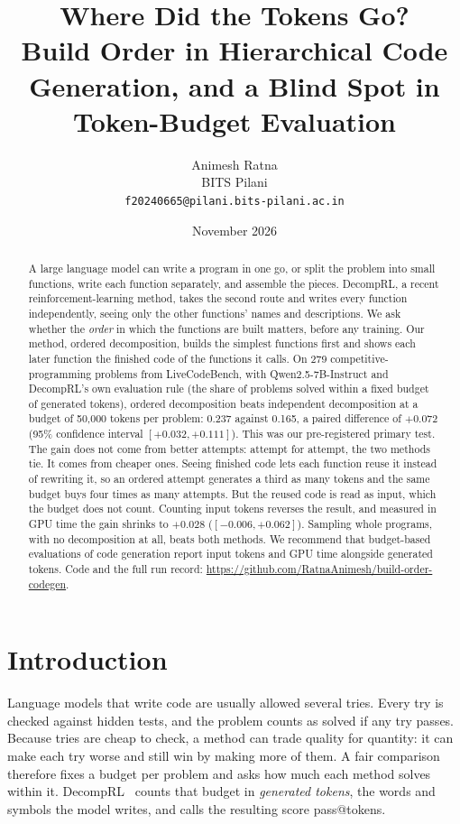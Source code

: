 \documentclass[11pt]{article}
\title{\textbf{Where Did the Tokens Go?}\\[4pt]
\large Build Order in Hierarchical Code Generation, and a Blind Spot in Token-Budget Evaluation}
\author{Animesh Ratna\\[2pt]
{\normalsize BITS Pilani}\\[1pt]
{\normalsize\texttt{f20240665@pilani.bits-pilani.ac.in}}}
\date{November 2026}
\begin{document}
\maketitle

\begin{abstract}
A large language model can write a program in one go, or split the problem into small functions, write each function
separately, and assemble the pieces. DecompRL, a recent reinforcement-learning method, takes the second route and
writes every function independently, seeing only the other functions' names and descriptions. We ask whether the
\emph{order} in which the functions are built matters, before any training. Our method, ordered decomposition, builds
the simplest functions first and shows each later function the finished code of the functions it calls.
On 279 competitive-programming problems from LiveCodeBench, with Qwen2.5-7B-Instruct and DecompRL's own evaluation
rule (the share of problems solved within a fixed budget of generated tokens), ordered decomposition beats independent
decomposition at a budget of 50,000 tokens per problem: 0.237 against 0.165, a paired difference of $+0.072$ (95\%
confidence interval $[+0.032, +0.111]$). This was our pre-registered primary test.
The gain does not come from better attempts: attempt for attempt, the two methods tie. It comes from cheaper ones.
Seeing finished code lets each function reuse it instead of rewriting it, so an ordered attempt generates a third as
many tokens and the same budget buys four times as many attempts. But the reused code is read as input, which the
budget does not count. Counting input tokens reverses the result, and measured in GPU time the gain shrinks to
$+0.028$ ($[-0.006, +0.062]$). Sampling whole programs, with no decomposition at all, beats both methods.
We recommend that budget-based evaluations of code generation report input tokens and GPU time alongside generated
tokens. Code and the full run record: \url{https://github.com/RatnaAnimesh/build-order-codegen}.
\end{abstract}

\section{Introduction}

Language models that write code are usually allowed several tries. Every try is checked against hidden tests, and the
problem counts as solved if any try passes. Because tries are cheap to check, a method can trade quality for quantity:
it can make each try worse and still win by making more of them. A fair comparison therefore fixes a budget per
problem and asks how much each method solves within it. DecompRL~\citep{decugis2026decomprl} counts that budget in
\emph{generated tokens}, the words and symbols the model writes, and calls the resulting score pass@tokens.
\end{document}
